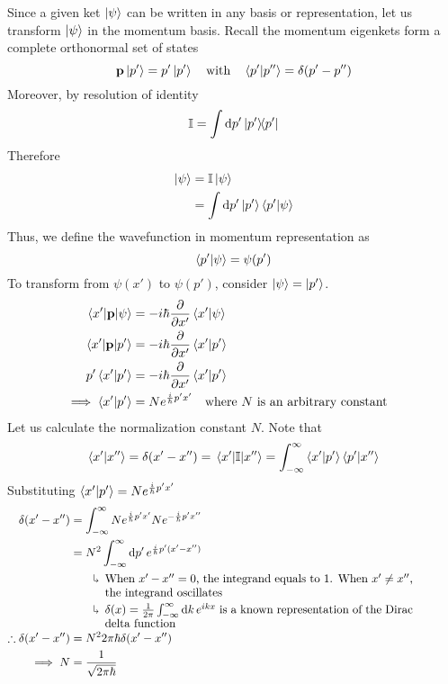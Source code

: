 \documentclass[12pt,a4paper,titlepage]{article}
\newcommand{\explain}[1]{%
	\quad\rotatebox[origin=c]{180}{\enskip$\Lsh$}\hfill
	\begin{minipage}[t]{\dimexpr\linewidth-8em\relax}
	#1
	\end{minipage}\hspace{4em}\bigskip
}
\begin{document}
Since a given ket $\ket{\psi}$ can be written in any basis or representation, let us transform $\ket{\psi}$ in the momentum basis. Recall the momentum eigenkets form a complete orthonormal set of states
\begin{equation}
\vb{p}\ket{p'}=p'\ket{p'}\qq{with}\ip{p'}{p''}=\delta(p'-p'')
\end{equation}
Moreover, by resolution of identity
\begin{equation}
\mathbb{I}=\int\dd{p'}\op{p'}
\end{equation}
Therefore
\begin{equation}
\begin{aligned}
\ket{\psi}&=\mathbb{I}\ket{\psi}\\
&=\int\dd{p'}\ket{p'}\ip{p'}{\psi}
\end{aligned}
\end{equation}
Thus, we define the wavefunction in momentum representation as
\begin{equation}
\ip{p'}{\psi}=\psi(p')
\end{equation}
To transform from $\psi(x')$ to $\psi(p')$, consider $\ket{\psi}=\ket{p'}$.
\begin{equation}
\begin{aligned}
\mel{x'}{\vb{p}}{\psi}&=-i\hbar\pdv{x'}\ip{x'}{\psi}\\
\mel{x'}{\vb{p}}{p'}&=-i\hbar\pdv{x'}\ip{x'}{p'}\\
p'\ip{x'}{p'}&=-i\hbar\pdv{x'}\ip{x'}{p'}\\
\implies\ip{x'}{p'}&=Ne^{\frac{i}{\hbar}p'x'}\qq{where $N$ is an arbitrary constant}
\end{aligned}
\end{equation}
Let us calculate the normalization constant $N$. Note that
\begin{equation}
\begin{aligned}
\ip{x'}{x''}=\delta(x'-x'')=\mel{x'}{\mathbb{I}}{x''}=\int_{-\infty}^{\infty}\ip{x'}{p'}\ip{p'}{x''}
\end{aligned}
\end{equation}
Substituting $\ip{x'}{p'}=Ne^{\frac{i}{\hbar}p'x'}$
\begin{equation}
\begin{aligned}
\delta(x'-x'')&=\int_{-\infty}^{\infty}Ne^{\frac{i}{\hbar}p'x'}Ne^{-\frac{i}{\hbar}p'x''}\\
&=N^{2}\int_{-\infty}^{\infty}\dd{p'}e^{\frac{i}{\hbar}p'(x'-x'')}\\
&\quad\explain{When $x'-x''=0$, the integrand equals to 1. When $x'\neq x''$, the integrand oscillates}\\
&\quad\explain{$\delta(x)=\frac{1}{2\pi}\int_{-\infty}^{\infty}\dd{k}e^{ikx}$ is a known representation of the Dirac delta function}\\
\therefore\delta(x'-x'')&=N^{2}2\pi\hbar\delta(x'-x'')\\
\implies N&=\frac{1}{\sqrt{2\pi\hbar}}
\end{aligned}
\end{equation}
\end{document}
